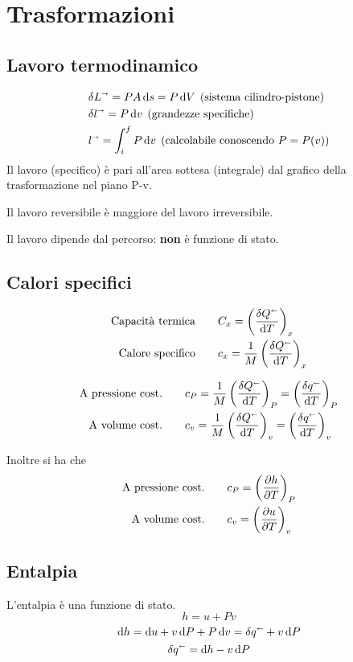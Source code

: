 \section{Trasformazioni}

\subsection{Lavoro termodinamico}

\begin{align*}
    &\delta L^\shortrightarrow = PA\dd{s} = P\dd{V} \; \text{(sistema cilindro-pistone)}\\
    &\delta l^\shortrightarrow = P\dd{v} \; (\text{grandezze specifiche})\\
    &l^\shortrightarrow = \int_i^f P\dd{v} \; (\text{calcolabile conoscendo $P = P(v)$})
\end{align*}
Il lavoro (specifico) è pari all'area sottesa (integrale) dal grafico della trasformazione nel piano P-v.\newline

Il lavoro reversibile è maggiore del lavoro irreversibile.\newline

Il lavoro dipende dal percorso: \textbf{non} è funzione di stato.

\subsection{Calori specifici}

\begin{align*}
    \text{Capacità termica} &\qquad C_x = \left(\frac{\delta Q^\shortleftarrow}{\dd{T}}\right)_x \\
    \text{Calore specifico} &\qquad c_x = \frac{1}{M} \left(\frac{\delta Q^\shortleftarrow}{\dd{T}}\right)_x
\end{align*}

\begin{align*}
    \text{A pressione cost.} &\qquad c_P = \frac{1}{M} \left(\frac{\delta Q^\shortleftarrow}{\dd{T}}\right)_P = \left(\frac{\delta q^\shortleftarrow}{\dd{T}}\right)_P \\
    \text{A volume cost.} &\qquad c_v = \frac{1}{M} \left(\frac{\delta Q^\shortleftarrow}{\dd{T}}\right)_v = \left(\frac{\delta q^\shortleftarrow}{\dd{T}}\right)_v
\end{align*}

Inoltre si ha che
\begin{align*}
    \text{A pressione cost.} &\qquad c_P = \qty(\pdv{h}{T})_P\\
    \text{A volume cost.} &\qquad c_v = \qty(\pdv{u}{T})_v
\end{align*}

\subsection{Entalpia}

L'entalpia è una funzione di stato.
\[ h = u + Pv \]
\[ \dd{h} = \dd{u} + v\dd{P} + P\dd{v} = \delta q^\shortleftarrow + v\dd{P} \]
\[ \delta q^\shortleftarrow = \dd{h} - v\dd{P} \]
